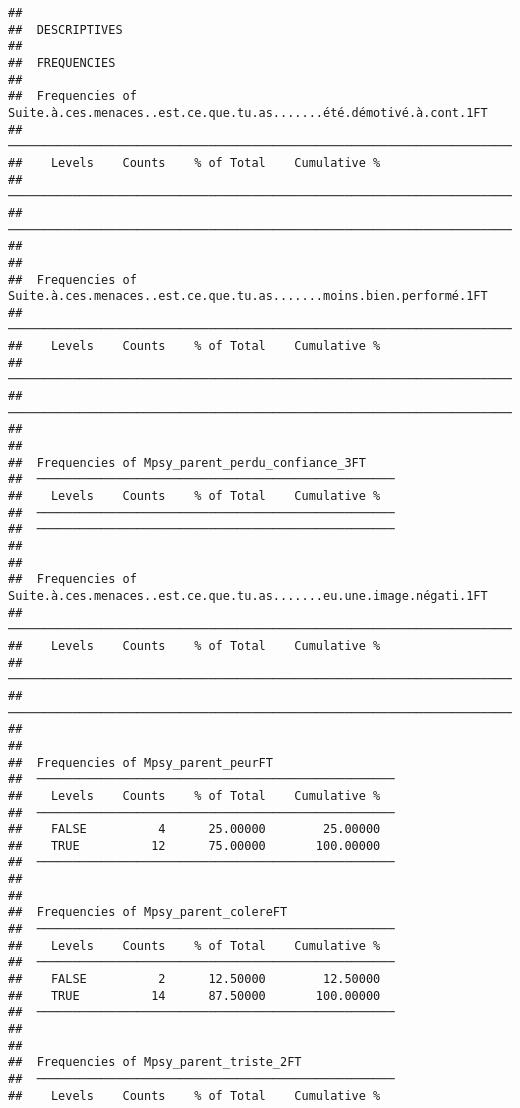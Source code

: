 \documentclass[
]{article}
\begin{document}
\begin{verbatim}
## 
##  DESCRIPTIVES
## 
##  FREQUENCIES
## 
##  Frequencies of Suite.à.ces.menaces..est.ce.que.tu.as.......été.démotivé.à.cont.1FT 
##  ────────────────────────────────────────────────────────────────────────────────── 
##    Levels    Counts    % of Total    Cumulative %   
##  ────────────────────────────────────────────────────────────────────────────────── 
##  ────────────────────────────────────────────────────────────────────────────────── 
## 
## 
##  Frequencies of Suite.à.ces.menaces..est.ce.que.tu.as.......moins.bien.performé.1FT 
##  ────────────────────────────────────────────────────────────────────────────────── 
##    Levels    Counts    % of Total    Cumulative %   
##  ────────────────────────────────────────────────────────────────────────────────── 
##  ────────────────────────────────────────────────────────────────────────────────── 
## 
## 
##  Frequencies of Mpsy_parent_perdu_confiance_3FT     
##  ────────────────────────────────────────────────── 
##    Levels    Counts    % of Total    Cumulative %   
##  ────────────────────────────────────────────────── 
##  ────────────────────────────────────────────────── 
## 
## 
##  Frequencies of Suite.à.ces.menaces..est.ce.que.tu.as.......eu.une.image.négati.1FT 
##  ────────────────────────────────────────────────────────────────────────────────── 
##    Levels    Counts    % of Total    Cumulative %   
##  ────────────────────────────────────────────────────────────────────────────────── 
##  ────────────────────────────────────────────────────────────────────────────────── 
## 
## 
##  Frequencies of Mpsy_parent_peurFT                  
##  ────────────────────────────────────────────────── 
##    Levels    Counts    % of Total    Cumulative %   
##  ────────────────────────────────────────────────── 
##    FALSE          4      25.00000        25.00000   
##    TRUE          12      75.00000       100.00000   
##  ────────────────────────────────────────────────── 
## 
## 
##  Frequencies of Mpsy_parent_colereFT                
##  ────────────────────────────────────────────────── 
##    Levels    Counts    % of Total    Cumulative %   
##  ────────────────────────────────────────────────── 
##    FALSE          2      12.50000        12.50000   
##    TRUE          14      87.50000       100.00000   
##  ────────────────────────────────────────────────── 
## 
## 
##  Frequencies of Mpsy_parent_triste_2FT              
##  ────────────────────────────────────────────────── 
##    Levels    Counts    % of Total    Cumulative %   

\end{verbatim}
\end{document}
